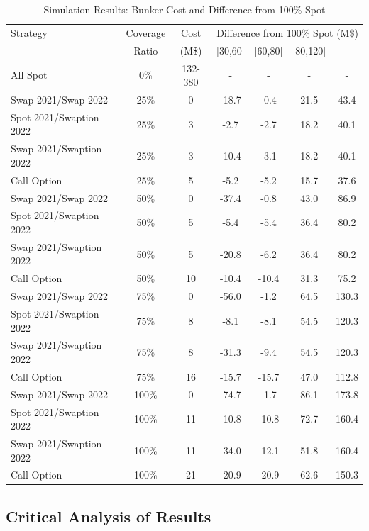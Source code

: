 \documentclass[12pt]{article}
\begin{document}
\begin{table}[h]
\centering
\caption{Simulation Results: Bunker Cost and Difference from 100\% Spot}
\label{tab:simulation_results}
\begin{tabular}{lcccccc}
\hline
Strategy & Coverage & Cost & \multicolumn{4}{c}{Difference from 100\% Spot (M\$)} \\
 & Ratio & (M\$) & [30,60] & [60,80] & [80,120] & \geq 120 \\
\hline
All Spot & 0\% & 132-380 & - & - & - & - \\
Swap 2021/Swap 2022 & 25\% & 0 & -18.7 & -0.4 & 21.5 & 43.4 \\
Spot 2021/Swaption 2022 & 25\% & 3 & -2.7 & -2.7 & 18.2 & 40.1 \\
Swap 2021/Swaption 2022 & 25\% & 3 & -10.4 & -3.1 & 18.2 & 40.1 \\
Call Option & 25\% & 5 & -5.2 & -5.2 & 15.7 & 37.6 \\
\hline
Swap 2021/Swap 2022 & 50\% & 0 & -37.4 & -0.8 & 43.0 & 86.9 \\
Spot 2021/Swaption 2022 & 50\% & 5 & -5.4 & -5.4 & 36.4 & 80.2 \\
Swap 2021/Swaption 2022 & 50\% & 5 & -20.8 & -6.2 & 36.4 & 80.2 \\
Call Option & 50\% & 10 & -10.4 & -10.4 & 31.3 & 75.2 \\
\hline
Swap 2021/Swap 2022 & 75\% & 0 & -56.0 & -1.2 & 64.5 & 130.3 \\
Spot 2021/Swaption 2022 & 75\% & 8 & -8.1 & -8.1 & 54.5 & 120.3 \\
Swap 2021/Swaption 2022 & 75\% & 8 & -31.3 & -9.4 & 54.5 & 120.3 \\
Call Option & 75\% & 16 & -15.7 & -15.7 & 47.0 & 112.8 \\
\hline
Swap 2021/Swap 2022 & 100\% & 0 & -74.7 & -1.7 & 86.1 & 173.8 \\
Spot 2021/Swaption 2022 & 100\% & 11 & -10.8 & -10.8 & 72.7 & 160.4 \\
Swap 2021/Swaption 2022 & 100\% & 11 & -34.0 & -12.1 & 51.8 & 160.4 \\
Call Option & 100\% & 21 & -20.9 & -20.9 & 62.6 & 150.3 \\
\hline
\end{tabular}
\end{table}
\subsection{Critical Analysis of Results}
\end{document}
